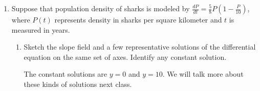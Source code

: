 \documentclass[main]{subfiles}
\begin{document}
\begin{enumerate}
\begin{enumerate}
\begin{problem}[.3in]
  \end{problem}

  \begin{solution}
  You might have noticed that the slope field for $\frac{dy}{dt} = 1 -
  y$ looks exactly like the slope field for $\frac{dy}{dt} = -y$,
  except that it's shifted up by 1.  So, the solution curves should be
  the solution curves of $\frac{dy}{dt} = -y$ 
  (and we know that those solutions are $Ce^{-t}$),
  shifted up by 1.  Thus, a good guess is $y = Ce^{-t} +
  1$, and we can check that this is correct: if $y = C e^{-t} + 1$,
  then $\frac{dy}{dt} = - C e^{-t}$, which is the same as $1 - y = - C
  e^{-t}$.
  \end{solution}
  
\end{enumerate}




\pspace{\newpage}
\item
\begin{problem}
  Suppose that population density of sharks is modeled by $\displaystyle \frac{dP}{dt} =
  \frac{5}{8} P \left( 1 - \frac{P}{10} \right)$, where $P(t)$ represents density in sharks per square 
  kilometer and $t$ is measured in years.
\end{problem}

\begin{enumerate}
  \item 
  \begin{problem}[2.7in]
    Sketch the slope field and a few representative solutions of the differential equation on the same set of axes.  Identify
    any constant solution.
  \end{problem}
 
  \begin{solution}
  The constant solutions are $y=0$ and $y=10$.  We will talk
  more about these kinds of solutions next class.

\end{solution}
\end{enumerate}
\end{enumerate}
\end{document}
